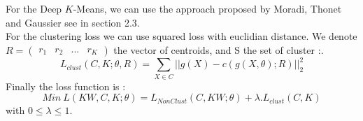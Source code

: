 For the Deep $K$-Means, we can use the approach proposed by Moradi, Thonet and Gaussier 
\cite{Deap-K-Means} see in section 2.3.\\
For the clustering loss we can use squared loss with euclidian distance. We
denote $R = \begin{pmatrix} r_1 & r_2 & ... & r_K\end{pmatrix}$ the vector of
centroids, and S the set of cluster :.  
\begin{equation}\label{eq:loss_clust}
  L_{clust}(C, K; \theta, R) = \sum_{X \in C} ||g(X) - c(g(X, \theta); R) ||_2^2 
\end{equation}
Finally the loss function is :
\begin{equation}\label{eq:loss_FINALE}
  Min~L(KW, C, K; \theta) = L_{NonClust}(C, KW; \theta) + \lambda.L_{clust}(C,K)
\end{equation}
with $0 \leq \lambda \leq 1$.

